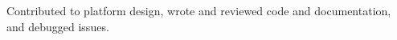 \begin{cventries}
{\begin{cvitems}
        \item{Contributed to platform design, wrote and reviewed code and documentation, and debugged issues.} %
%
      \end{cvitems}
    }


\end{cventries}
